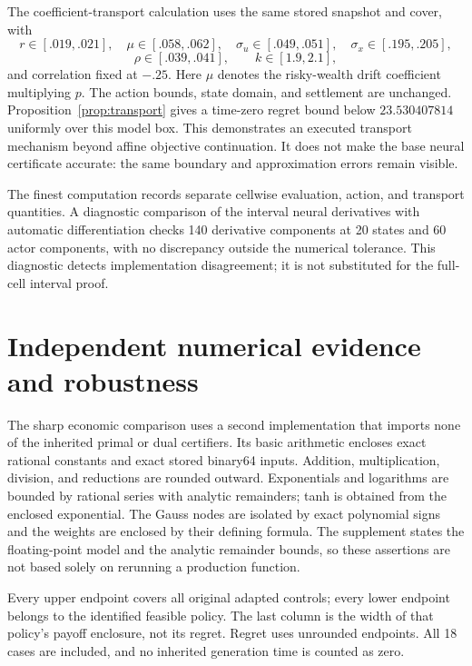 The coefficient-transport calculation uses the same stored snapshot and cover, with
\[
 r\in[.019,.021],\quad\mu\in[.058,.062],\quad
 \sigma_u\in[.049,.051],\quad\sigma_x\in[.195,.205],
\]
\[
 \rho\in[.039,.041],\qquad k\in[1.9,2.1],
\]
and correlation fixed at $-.25$. Here $\mu$ denotes the risky-wealth drift coefficient multiplying $p$. The action bounds, state domain, and settlement are unchanged. Proposition~\ref{prop:transport} gives a time-zero regret bound below $23.530407814$ uniformly over this model box. This demonstrates an executed transport mechanism beyond affine objective continuation. It does not make the base neural certificate accurate: the same boundary and approximation errors remain visible.

The finest computation records separate cellwise evaluation, action, and transport quantities. A diagnostic comparison of the interval neural derivatives with automatic differentiation checks 140 derivative components at 20 states and 60 actor components, with no discrepancy outside the numerical tolerance. This diagnostic detects implementation disagreement; it is not substituted for the full-cell interval proof.

\section{Independent numerical evidence and robustness}\label{sec:independence}
The sharp economic comparison uses a second implementation that imports none of the inherited primal or dual certifiers. Its basic arithmetic encloses exact rational constants and exact stored binary64 inputs. Addition, multiplication, division, and reductions are rounded outward. Exponentials and logarithms are bounded by rational series with analytic remainders; tanh is obtained from the enclosed exponential. The Gauss nodes are isolated by exact polynomial signs and the weights are enclosed by their defining formula. The supplement states the floating-point model and the analytic remainder bounds, so these assertions are not based solely on rerunning a production function.

\begin{table}[t]\centering\small
\caption{Independent central-state certificates for all retained prices}\label{tab:nodes}

\par\smallskip\footnotesize Every upper endpoint covers all original adapted controls; every lower endpoint belongs to the identified feasible policy. The last column is the width of that policy's payoff enclosure, not its regret. Regret uses unrounded endpoints. All 18 cases are included, and no inherited generation time is counted as zero.
\end{table}

